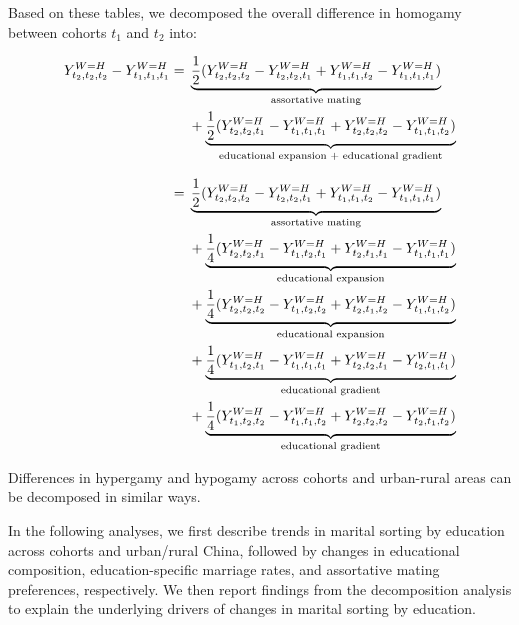 Based on these tables, we decomposed the overall difference in homogamy between cohorts $t_{1}$ and $t_{2}$ into:

\begin{align}
    Y^{W=H}_{t_{2}, t_{2}, t_{2}} - Y^{W=H}_{t_{1}, t_{1}, t_{1}} = {} &
    \underbrace{\frac{1}{2} (Y^{W=H}_{t_{2}, t_{2}, t_{2}} - Y^{W=H}_{t_{2}, t_{2}, t_{1}} + Y^{W=H}_{t_{1}, t_{1}, t_{2}} - Y^{W=H}_{t_{1}, t_{1}, t_{1}})}_{\text{\scriptsize assortative mating}} \nonumber                                                                                                 \\
                                                                       & + \underbrace{\frac{1}{2}(Y^{W=H}_{t_{2}, t_{2}, t_{1}} - Y^{W=H}_{t_{1}, t_{1}, t_{1}} + Y^{W=H}_{t_{2}, t_{2}, t_{2}} - Y^{W=H}_{t_{1}, t_{1}, t_{2}})}_{\text{\scriptsize educational expansion + educational gradient}} \nonumber \\[8pt]
    = {}                                                               & \underbrace{\frac{1}{2} (Y^{W=H}_{t_{2}, t_{2}, t_{2}} - Y^{W=H}_{t_{2}, t_{2}, t_{1}} + Y^{W=H}_{t_{1}, t_{1}, t_{2}} - Y^{W=H}_{t_{1}, t_{1}, t_{1}})}_{\text{\scriptsize assortative mating}} \nonumber                            \\
                                                                       & + \underbrace{\frac{1}{4}(Y^{W=H}_{t_{2}, t_{2}, t_{1}} - Y^{W=H}_{t_{1}, t_{2}, t_{1}} + Y^{W=H}_{t_{2}, t_{1}, t_{1}} - Y^{W=H}_{t_{1}, t_{1}, t_{1}})}_{\text{\scriptsize educational expansion}} \nonumber                        \\
                                                                       & + \underbrace{\frac{1}{4}(Y^{W=H}_{t_{2}, t_{2}, t_{2}} - Y^{W=H}_{t_{1}, t_{2}, t_{2}} + Y^{W=H}_{t_{2}, t_{1}, t_{2}} - Y^{W=H}_{t_{1}, t_{1}, t_{2}})}_{\text{\scriptsize educational expansion}} \nonumber                        \\
                                                                       & + \underbrace{\frac{1}{4}(Y^{W=H}_{t_{1}, t_{2}, t_{1}} - Y^{W=H}_{t_{1}, t_{1}, t_{1}} + Y^{W=H}_{t_{2}, t_{2}, t_{1}} - Y^{W=H}_{t_{2}, t_{1}, t_{1}})}_{\text{\scriptsize educational gradient}} \nonumber                         \\
                                                                       & + \underbrace{\frac{1}{4}(Y^{W=H}_{t_{1}, t_{2}, t_{2}} - Y^{W=H}_{t_{1}, t_{1}, t_{2}} + Y^{W=H}_{t_{2}, t_{2}, t_{2}} - Y^{W=H}_{t_{2}, t_{1}, t_{2}})}_{\text{\scriptsize educational gradient}}
\end{align}

Differences in hypergamy and hypogamy across cohorts and urban-rural areas can be decomposed in similar ways.

In the following analyses, we first describe trends in marital sorting by education across cohorts and urban/rural China, followed by changes in educational composition, education-specific marriage rates, and assortative mating preferences, respectively. We then report findings from the decomposition analysis to explain the underlying drivers of changes in marital sorting by education.
